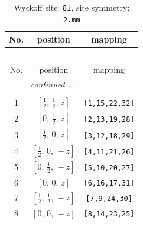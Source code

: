 \documentclass[fleqn,8pt]{jsarticle}
\begin{document}
\renewcommand{\arraystretch}{1.2}
\begin{longtable}{ccc}
\caption{Wyckoff site: {\tt 8i}, site symmetry: {\tt 2.mm}}
 \\
 \hline \hline
No. & position & mapping \\ \hline \endfirsthead

\multicolumn{2}{l}{\tablename\ \thetable{}} \\
 \hline \hline
No. & position & mapping \\ \hline \endhead

 \hline \hline
\multicolumn{2}{r}{\footnotesize\it continued ...} \\ \endfoot

 \hline \hline
\multicolumn{2}{r}{} \\ \endlastfoot

1 & $\left[ \frac{1}{2},\, \frac{1}{2},\, z \right]$ & {\tt [1,15,22,32]} \\ \hline
2 & $\left[ 0,\, \frac{1}{2},\, z \right]$ & {\tt [2,13,19,28]} \\ \hline
3 & $\left[ \frac{1}{2},\, 0,\, z \right]$ & {\tt [3,12,18,29]} \\ \hline
4 & $\left[ \frac{1}{2},\, 0,\, - z \right]$ & {\tt [4,11,21,26]} \\ \hline
5 & $\left[ 0,\, \frac{1}{2},\, - z \right]$ & {\tt [5,10,20,27]} \\ \hline
6 & $\left[ 0,\, 0,\, z \right]$ & {\tt [6,16,17,31]} \\ \hline
7 & $\left[ \frac{1}{2},\, \frac{1}{2},\, - z \right]$ & {\tt [7,9,24,30]} \\ \hline
8 & $\left[ 0,\, 0,\, - z \right]$ & {\tt [8,14,23,25]} \\
\end{longtable}
\renewcommand{\arraystretch}{1.2}
\end{document}
